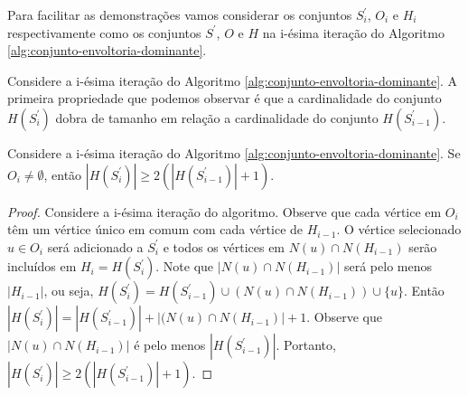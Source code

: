 

Para facilitar as demonstrações vamos considerar os conjuntos $S^\prime_i$, $O_i$ e $H_i$ respectivamente como os conjuntos $S^\prime$, $O$ e $H$ na i-ésima iteração do Algoritmo \ref{alg:conjunto-envoltoria-dominante}.

Considere a i-ésima iteração do Algoritmo \ref{alg:conjunto-envoltoria-dominante}. A primeira propriedade que podemos observar é que a cardinalidade do conjunto $H(S^\prime_i)$ dobra de tamanho em relação a cardinalidade do conjunto $H(S^\prime_{i-1})$.  

\begin{lemma}
Considere a i-ésima iteração do Algoritmo \ref{alg:conjunto-envoltoria-dominante}. Se $O_i \neq \emptyset$, então $|H(S^\prime_i)|\geq 2 (|H(S^\prime_{i-1})|+1)$.
\label{pior-caso-hs}
\end{lemma}
\begin{proof}
Considere a i-ésima iteração do algoritmo. Observe que cada vértice em $O_{i}$ têm um vértice único em comum com cada vértice de $H_{i-1}$. O vértice selecionado $u \in O_{i}$ será adicionado a $S^\prime_{i}$ e todos os vértices em $N(u)\cap N(H_{i-1})$ serão incluídos em $H_{i}=H(S^\prime_i)$. Note que $|N(u)\cap N(H_{i-1})|$ será pelo menos $|H_{i-1}|$, ou seja,  $H(S^\prime_i) = H(S^\prime_{i-1}) \cup (N(u) \cap N(H_{i-1})) \cup \{u\}$. Então $|H(S^\prime_i)| = |H(S^\prime_{i-1})| + |(N(u) \cap N(H_{i-1})| + 1$. Observe que $|N(u) \cap N(H_{i-1})|$ é pelo menos $|H(S^\prime_{i-1})|$. Portanto, $|H(S^\prime_i)|\ge 2 (| H (S^\prime_ { i-1}) | +1)$.
\end{proof}

